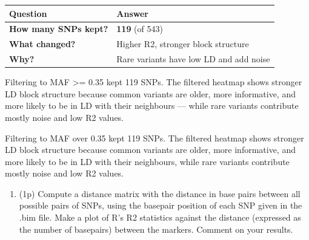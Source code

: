 \documentclass[
]{article}
\newcounter{none} %
\providecommand{\tightlist}{%
  \setlength{\itemsep}{0pt}\setlength{\parskip}{0pt}}
\begin{document}
{\def\LTcaptype{none} %
\begin{longtable}[]{@{}ll@{}}
\toprule\noalign{}
Question & Answer \\
\midrule\noalign{}
\endhead
\bottomrule\noalign{}
\endlastfoot
\textbf{How many SNPs kept?} & \textbf{119} (of 543) \\
\textbf{What changed?} & Higher R2, stronger block structure \\
\textbf{Why?} & Rare variants have low LD and add noise \\
\end{longtable}
}

Filtering to MAF \textgreater= 0.35 kept 119 SNPs. The filtered heatmap
shows stronger LD block structure because common variants are older,
more informative, and more likely to be in LD with their neighbours ---
while rare variants contribute mostly noise and low R2 values.

Filtering to MAF over 0.35 kept 119 SNPs. The filtered heatmap shows
stronger LD block structure because common variants are older, more
informative, and more likely to be in LD with their neighbours, while
rare variants contribute mostly noise and low R2 values.

\begin{enumerate}
\def\labelenumi{\arabic{enumi}.}
\setcounter{enumi}{6}
\tightlist
\item
  (1p) Compute a distance matrix with the distance in base pairs between
  all possible pairs of SNPs, using the basepair position of each SNP
  given in the .bim file. Make a plot of R's R2 statistics against the
  distance (expressed as the number of basepairs) between the markers.
  Comment on your results.
\end{enumerate}
\end{document}
